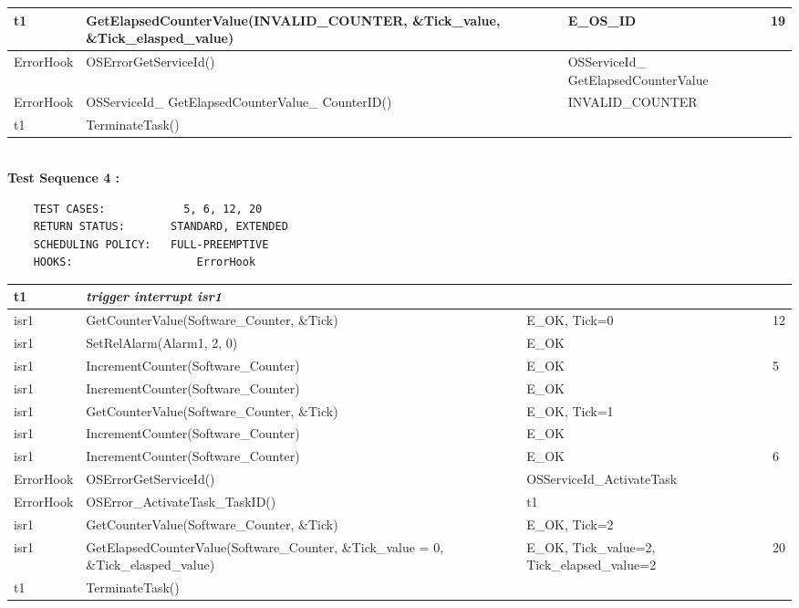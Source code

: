 \documentclass[10pt]{article}
\newlength{\Li}\settowidth{\Li}{Running}
\newlength{\Lii}\setlength{\Lii}{7cm}
\newlength{\Liiii}\setlength{\Liiii}{0.9cm}
\newlength{\Liii}\setlength{\Liii}{\textwidth} \addtolength{\Liii}{-\Li} \addtolength{\Liii}{-\Lii} \addtolength{\Liii}{-\Liiii}
\begin{document}
\begin{supertabular}{|p{\Li}|p{\Lii}|p{\Liii}|p{\Liiii}|}
	t1		& GetElapsedCounterValue(INVALID\_COUNTER, \&Tick\_value, \&Tick\_elasped\_value)				& E\_OS\_ID							& 19 \\ \hline
	ErrorHook	& OSErrorGetServiceId()																	& OSServiceId\_ GetElapsedCounterValue	& \\ \hline
	ErrorHook	& OSServiceId\_ GetElapsedCounterValue\_ CounterID()										& INVALID\_COUNTER					& \\ \hline
	
	t1		& TerminateTask()																		& 									& \\ \hline
	\end{supertabular}\\

	\textbf{Test Sequence 4 :}
	\begin{lstlisting}
	TEST CASES:		       5, 6, 12, 20
	RETURN STATUS:	  	 STANDARD, EXTENDED
	SCHEDULING POLICY:   FULL-PREEMPTIVE
	HOOKS:			         ErrorHook
	\end{lstlisting}
	
	
	\begin{supertabular}{|p{\Li}|p{\Lii}|p{\Liii}|p{\Liiii}|} \hline 
	t1	& \textit{trigger interrupt isr1}									& 														& \\ \hline
	isr1	& GetCounterValue(Software\_Counter, \&Tick)					& E\_OK, Tick=0											& 12 \\ \hline
	isr1	& SetRelAlarm(Alarm1, 2, 0)									& E\_OK													& \\ \hline
	isr1	& IncrementCounter(Software\_Counter)							& E\_OK													& 5\\ \hline
	isr1	& IncrementCounter(Software\_Counter)							& E\_OK													& \\ \hline
	isr1	& GetCounterValue(Software\_Counter, \&Tick)					& E\_OK, Tick=1											& \\ \hline
	isr1	& IncrementCounter(Software\_Counter)							& E\_OK													& \\ \hline
	isr1	& IncrementCounter(Software\_Counter)							& E\_OK													& 6 \\ \hline
	ErrorHook		& OSErrorGetServiceId()								& OSServiceId\_ActivateTask									& \\ \hline
	ErrorHook		& OSError\_ActivateTask\_TaskID()						& t1														& \\ \hline
	isr1	& GetCounterValue(Software\_Counter, \&Tick)					& E\_OK, Tick=2											& \\ \hline
	isr1	& GetElapsedCounterValue(Software\_Counter, \&Tick\_value = 0, \&Tick\_elasped\_value)	& E\_OK, Tick\_value=2, Tick\_elapsed\_value=2	& 20 \\ \hline
	t1	& TerminateTask()											& 														& \\ \hline
	\end{supertabular}\\
	
\end{document}
